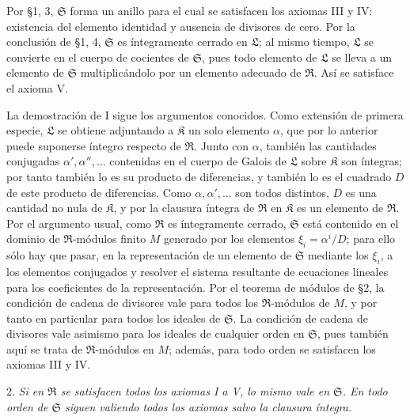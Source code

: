 \documentclass[11pt]{article}
\providecommand{\mR}{\mathfrak{R}}
\providecommand{\mK}{\mathfrak{K}}
\providecommand{\mL}{\mathfrak{L}}
\providecommand{\mS}{\mathfrak{S}}
\begin{document}
Por §1, 3, $\mS$ forma un anillo para el cual se satisfacen los axiomas III y IV: existencia del elemento identidad y ausencia de divisores de cero. Por la conclusión de §1, 4, $\mS$ es íntegramente cerrado en $\mL$; al mismo tiempo, $\mL$ se convierte en el cuerpo de cocientes de $\mS$, pues todo elemento de $\mL$ se lleva a un elemento de $\mS$ multiplicándolo por un elemento adecuado de $\mR$. Así se satisface el axioma V.

La demostración de I sigue los argumentos conocidos. Como extensión de primera especie, $\mL$ se obtiene adjuntando a $\mK$ un solo elemento $\alpha$, que por lo anterior puede suponerse íntegro respecto de $\mR$. Junto con $\alpha$, también las cantidades conjugadas $\alpha',\alpha'',\ldots$ contenidas en el cuerpo de Galois de $\mL$ sobre $\mK$ son íntegras; por tanto también lo es su producto de diferencias, y también lo es el cuadrado $D$ de este producto de diferencias. Como $\alpha,\alpha',\ldots$ son todos distintos, $D$ es una cantidad no nula de $\mK$, y por la clausura íntegra de $\mR$ en $\mK$ es un elemento de $\mR$. Por el argumento usual, como $\mR$ es íntegramente cerrado, $\mS$ está contenido en el dominio de $\mR$-módulos finito $M$ generado por los elementos $\xi_i=\alpha^i/D$; para ello sólo hay que pasar, en la representación de un elemento de $\mS$ mediante los $\xi_i$, a los elementos conjugados y resolver el sistema resultante de ecuaciones lineales para los coeficientes de la representación. Por el teorema de módulos de §2, la condición de cadena de divisores vale para todos los $\mR$-módulos de $M$, y por tanto en particular para todos los ideales de $\mS$. La condición de cadena de divisores vale asimismo para los ideales de cualquier orden en $\mS$, pues también aquí se trata de $\mR$-módulos en $M$; además, para todo orden se satisfacen los axiomas III y IV.

2. \emph{Si en $\mR$ se satisfacen todos los axiomas I a V, lo mismo vale en $\mS$. En todo orden de $\mS$ siguen valiendo todos los axiomas salvo la clausura íntegra.}
\end{document}
